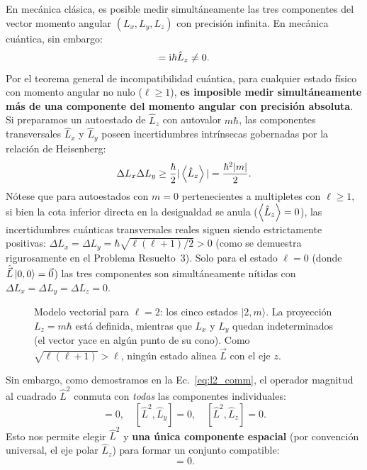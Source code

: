 En mecánica clásica, es posible medir simultáneamente las tres componentes del vector momento angular $(L_x, L_y, L_z)$ con precisión infinita. En mecánica cuántica, sin embargo:
\begin{equation}
    [\hat{L}_x, \hat{L}_y] = \iu\hbar\hat{L}_z \neq 0.
\end{equation}
Por el teorema general de incompatibilidad cuántica, para cualquier estado físico con momento angular no nulo ($\ell \ge 1$), \textbf{es imposible medir simultáneamente más de una componente del momento angular con precisión absoluta}. Si preparamos un autoestado de $\hat{L}_z$ con autovalor $m\hbar$, las componentes transversales $\hat{L}_x$ y $\hat{L}_y$ poseen incertidumbres intrínsecas gobernadas por la relación de Heisenberg:
\begin{equation}
    \Delta L_x \Delta L_y \ge \frac{\hbar}{2}|\left\langle \hat{L}_z \right\rangle| = \frac{\hbar^2 |m|}{2}.
\end{equation}
Nótese que para autoestados con $m = 0$ pertenecientes a multipletes con $\ell \ge 1$, si bien la cota inferior directa en la desigualdad se anula ($\left\langle \hat{L}_z \right\rangle=0$), las incertidumbres cuánticas transversales reales siguen siendo estrictamente positivas: $\Delta L_x = \Delta L_y = \hbar\sqrt{\ell(\ell+1)/2} > 0$ (como se demuestra rigurosamente en el Problema Resuelto~3). Solo para el estado $\ell = 0$ (donde $\hat{\vec{L}}\left| 0, 0 \right\rangle = \vec{0}$) las tres componentes son simultáneamente nítidas con $\Delta L_x = \Delta L_y = \Delta L_z = 0$.

\begin{figure}[H]
    \centering
    
    \caption{Modelo vectorial para $\ell=2$: los cinco estados $|2,m\rangle$. La proyección $L_z=m\hbar$ está definida, mientras que $L_x$ y $L_y$ quedan indeterminados (el vector yace en algún punto de su cono). Como $\sqrt{\ell(\ell+1)}>\ell$, ningún estado alinea $\vec L$ con el eje $z$.}
    \label{fig:cono_L}
    \label{fig:conos}
\end{figure}


Sin embargo, como demostramos en la Ec.~\eqref{eq:l2_comm}, el operador magnitud al cuadrado $\hat{L}^2$ conmuta con \textit{todas} las componentes individuales:
\begin{equation}
    [\hat{L}^2, \hat{L}_x] = 0, \quad [\hat{L}^2, \hat{L}_y] = 0, \quad [\hat{L}^2, \hat{L}_z] = 0.
\end{equation}
Esto nos permite elegir $\hat{L}^2$ y \textbf{una única componente espacial} (por convención universal, el eje polar $\hat{L}_z$) para formar un conjunto compatible:
\begin{equation}
    [\hat{L}^2, \hat{L}_z] = 0.
\end{equation}

